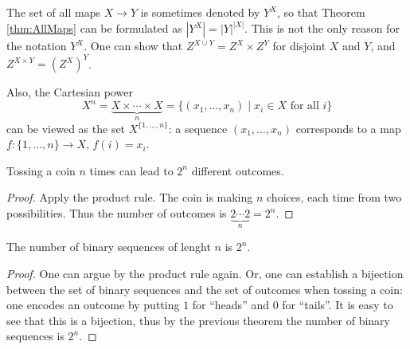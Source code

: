 \begin{page}

\begin{rem}
The set of all maps $X \to Y$ is sometimes denoted by $Y^X$, so that Theorem \ref{thm:AllMaps} can be formulated as $\left|Y^X\right| = |Y|^{|X|}$.
This is not the only reason for the notation $Y^X$.
One can show that $Z^{X \cup Y} = Z^X \times Z^Y$ for disjoint $X$ and $Y$, and $Z^{X \times Y} = (Z^X)^Y$.

Also, the Cartesian power
\[
X^n = \underbrace{X \times \cdots \times X}_{n} = \{(x_1, \ldots, x_n) \mid x_i \in X \text{ for all }i\}
\]
can be viewed as the set $X^{\{1, \ldots, n\}}$:
a sequence $(x_1, \ldots, x_n)$ corresponds to a map $f \colon \{1, \ldots, n\} \to X$, $f(i) = x_i$.
\end{rem}

\end{page}

\begin{page}

\begin{thm}
Tossing a coin $n$ times can lead to $2^n$ different outcomes.
\end{thm}

\end{page}

\begin{page}

\begin{proof}
Apply the product rule.
The coin is making $n$ choices, each time from two possibilities.
Thus the number of outcomes is $\underbrace{2  \cdots  2}_n = 2^n$.
\end{proof}


\end{page}

\begin{page}

\begin{thm}
The number of binary sequences of lenght $n$ is $2^n$.
\end{thm}

\end{page}

\begin{page}

\begin{proof}
One can argue by the product rule again.
Or, one can establish a bijection between the set of binary sequences and the set of outcomes when tossing a coin:
one encodes an outcome by putting $1$ for ``heads'' and $0$ for ``tails''.
It is easy to see that this is a bijection, thus by the previous theorem the number of binary sequences is $2^n$.
\end{proof}


\end{page}

